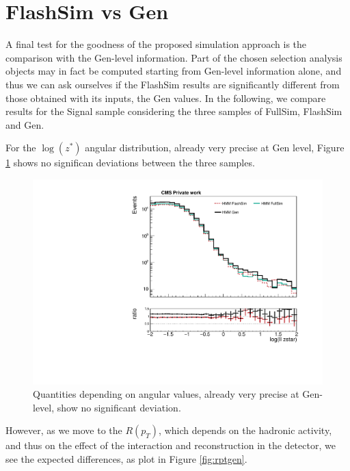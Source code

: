 \section{FlashSim vs Gen}

A final test for the goodness of the proposed simulation approach is the comparison with the Gen-level information. Part of the chosen selection analysis objects may in fact be computed starting from Gen-level information alone, and thus we can ask ourselves if the FlashSim results are significantly different from those obtained with its inputs, the Gen values. In the following, we compare results for the Signal sample considering the three samples of FullSim, FlashSim and Gen.

For the $\log(z^*)$ angular distribution, already very precise at Gen level, Figure \ref{fig:zstargen} shows no significan deviations between the three samples.

\begin{figure}
    \centering
    \includegraphics[width=\linewidth]{gfx/ch6/gen_vs_flash_ll_zstar_log___PreSel_log.pdf}
    \caption[Gen vs FlashSim for $z^*$]{Quantities depending on angular values, already very precise at Gen-level, show no significant deviation.}
    \label{fig:zstargen}
   \end{figure}
 
However, as we move to the $R(p_T)$, which depends on the hadronic activity, and thus on the effect of the interaction and reconstruction in the detector, we see the expected differences, as plot in Figure \ref{fig:rptgen}.

